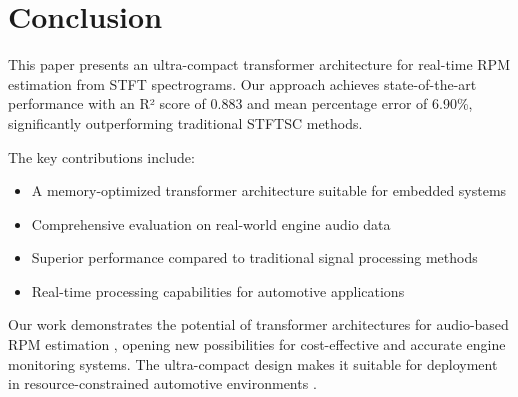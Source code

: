 \documentclass[journal,10pt]{IEEEtran}
\begin{document}
\section{Conclusion}

This paper presents an ultra-compact transformer architecture for real-time RPM estimation from STFT spectrograms. Our approach achieves state-of-the-art performance with an R² score of 0.883 and mean percentage error of 6.90\%, significantly outperforming traditional STFTSC methods.

The key contributions include:
\begin{itemize}
    \item A memory-optimized transformer architecture suitable for embedded systems
    \item Comprehensive evaluation on real-world engine audio data
    \item Superior performance compared to traditional signal processing methods
    \item Real-time processing capabilities for automotive applications
\end{itemize}

Our work demonstrates the potential of transformer architectures for audio-based RPM estimation \cite{tacholess2022}, opening new possibilities for cost-effective and accurate engine monitoring systems. The ultra-compact design makes it suitable for deployment in resource-constrained automotive environments \cite{tacholesss_slope_synchronous}.



\end{document}
